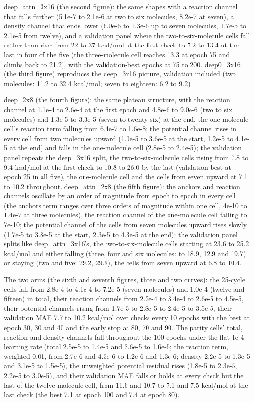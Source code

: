 \documentclass[10pt,a4paper]{article}
\begin{document}
deep\_attn\_3x16 (the second figure): the same shapes with a reaction channel that falls further (5.1e-7 to 2.1e-6 at two to six molecules, 8.2e-7 at seven), a density channel that ends lower (6.0e-6 to 1.3e-5 up to seven molecules, 1.7e-5 to 2.1e-5 from twelve), and a validation panel where the two-to-six-molecule cells fall rather than rise: from 22 to 37 kcal/mol at the first check to 7.2 to 13.4 at the last in four of the five (the three-molecule cell reaches 13.3 at epoch 75 and climbs back to 21.2), with the validation-best epochs at 75 to 200. deep0\_3x16 (the third figure) reproduces the deep\_3x16 picture, validation included (two molecules: 11.2 to 32.4 kcal/mol; seven to eighteen: 6.2 to 9.2).

deep\_2x8 (the fourth figure): the same plateau structure, with the reaction channel at 1.1e-4 to 2.6e-4 at the first epoch and 4.8e-6 to 9.0e-6 (two to six molecules) and 1.3e-5 to 3.3e-5 (seven to twenty-six) at the end, the one-molecule cell's reaction term falling from 6.4e-7 to 1.6e-8; the potential channel rises in every cell from two molecules upward (1.0e-5 to 3.6e-5 at the start, 1.2e-5 to 4.1e-5 at the end) and falls in the one-molecule cell (2.8e-5 to 2.4e-5); the validation panel repeats the deep\_3x16 split, the two-to-six-molecule cells rising from 7.8 to 9.4 kcal/mol at the first check to 10.8 to 26.0 by the last (validation-best at epoch 25 in all five), the one-molecule cell and the cells from seven upward at 7.1 to 10.2 throughout. deep\_attn\_2x8 (the fifth figure): the anchors and reaction channels oscillate by an order of magnitude from epoch to epoch in every cell (the anchors term ranges over three orders of magnitude within one cell, 4e-10 to 1.4e-7 at three molecules), the reaction channel of the one-molecule cell falling to 7e-10; the potential channel of the cells from seven molecules upward rises slowly (1.7e-5 to 3.8e-5 at the start, 2.3e-5 to 4.3e-5 at the end); the validation panel splits like deep\_attn\_3x16's, the two-to-six-molecule cells starting at 23.6 to 25.2 kcal/mol and either falling (three, four and six molecules: to 18.9, 12.9 and 19.7) or staying (two and five: 29.2, 29.8), the cells from seven upward at 6.8 to 10.4.

The two arms (the sixth and seventh figures, three and two curves): the 25-cycle cells fall from 2.8e-4 to 4.1e-4 to 7.2e-5 (seven molecules) and 1.0e-4 (twelve and fifteen) in total, their reaction channels from 2.2e-4 to 3.4e-4 to 2.6e-5 to 4.5e-5, their potential channels rising from 1.7e-5 to 2.8e-5 to 2.4e-5 to 3.5e-5, their validation MAE 7.7 to 10.2 kcal/mol over checks every 10 epochs with the best at epoch 30, 30 and 40 and the early stop at 80, 70 and 90. The parity cells' total, reaction and density channels fall throughout the 100 epochs under the flat 1e-4 learning rate (total 2.5e-5 to 1.4e-5 and 3.6e-5 to 1.6e-5; the reaction term, weighted 0.01, from 2.7e-6 and 4.3e-6 to 1.2e-6 and 1.3e-6; density 2.2e-5 to 1.3e-5 and 3.1e-5 to 1.5e-5), the unweighted potential residual rises (1.8e-5 to 2.3e-5, 2.2e-5 to 3.0e-5), and their validation MAE falls or holds at every check but the last of the twelve-molecule cell, from 11.6 and 10.7 to 7.1 and 7.5 kcal/mol at the last check (the best 7.1 at epoch 100 and 7.4 at epoch 80).
\end{document}
